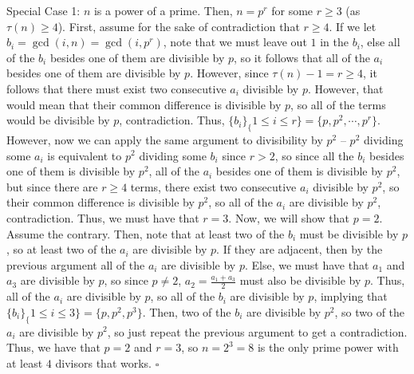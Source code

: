 \documentclass[a4paper]{article}
\begin{document}
\begin{question*}[c]{}
{Special Case 1: $n$ is a power of a prime.
Then, $n = p^r$ for some $r\geq 3$ (as $\tau(n) \geq 4$). First, assume for the sake of contradiction that $r\geq 4$. If we let $b_i = \gcd(i, n) = \gcd(i, p^r)$, note that we must leave out $1$ in the $b_i$, else all of the $b_i$ besides one of them are divisible by $p$, so it follows that all of the $a_i$ besides one of them are divisible by $p$. However, since $\tau(n)-1 = r \geq 4$, it follows that there must exist two consecutive $a_i$ divisible by $p$. However, that would mean that their common difference is divisible by $p$, so all of the terms would be divisible by $p$, contradiction. Thus, $\{b_i\}_\{1\leq i\leq r\} = \{p, p^2, \cdots, p^r\}$. However, now we can apply the same argument to divisibility by $p^2$ -- $p^2$ dividing some $a_i$ is equivalent to $p^2$ dividing some $b_i$ since $r > 2$, so since all the $b_i$ besides one of them is divisible by $p^2$, all of the $a_i$ besides one of them is divisible by $p^2$, but since there are $r\geq 4$ terms, there exist two consecutive $a_i$ divisible by $p^2$, so their common difference is divisible by $p^2$, so all of the $a_i$ are divisible by $p^2$, contradiction. Thus, we must have that $r = 3$. Now, we will show that $p = 2$. Assume the contrary. Then, note that at least two of the $b_i$ must be divisible by $p$, so at least two of the $a_i$ are divisible by $p$. If they are adjacent, then by the previous argument all of the $a_i$ are divisible by $p$. Else, we must have that $a_1$ and $a_3$ are divisible by $p$, so since $p\neq 2$, $a_2 = \frac{a_1+a_3}{2}$ must also be divisible by $p$. Thus, all of the $a_i$ are divisible by $p$, so all of the $b_i$ are divisible by $p$, implying that $\{b_i\}_\{1\leq i\leq 3\} = \{p, p^2, p^3\}$. Then, two of the $b_i$ are divisible by $p^2$, so two of the $a_i$ are divisible by $p^2$, so just repeat the previous argument to get a contradiction. Thus, we have that $p = 2$ and $r = 3$, so $n = 2^3 = 8$ is the only prime power with at least $4$ divisors that works. $\square$

}
\end{question*}
\end{document}
